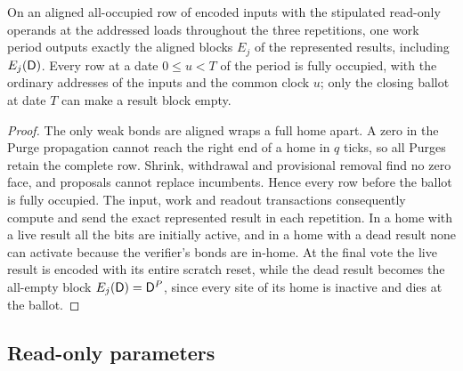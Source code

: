 \begin{lemma}\label{lem:clean}
On an aligned all-occupied row of encoded inputs with the stipulated read-only operands at the addressed loads throughout the three repetitions, one work period outputs exactly the aligned blocks \(E_j\) of the represented results, including \(E_j(\mathsf D)\). Every row at a date \(0\le u<T\) of the period is fully occupied, with the ordinary addresses of the inputs and the common clock \(u\); only the closing ballot at date \(T\) can make a result block empty.
\end{lemma}

\begin{proof}
The only weak bonds are aligned wraps a full home apart. A zero in the Purge propagation cannot reach the right end of a home in \(q\) ticks, so all Purges retain the complete row. Shrink, withdrawal and provisional removal find no zero face, and proposals cannot replace incumbents. Hence every row before the ballot is fully occupied. The input, work and readout transactions consequently compute and send the exact represented result in each repetition. In a home with a live result all the bits are initially active, and in a home with a dead result none can activate because the verifier's bonds are in-home. At the final vote the live result is encoded with its entire scratch reset, while the dead result becomes the all-empty block \(E_j(\mathsf D)=\mathsf D^P\), since every site of its home is inactive and dies at the ballot.
\end{proof}

\subsection{Read-only parameters}\label{sec:parameter}


